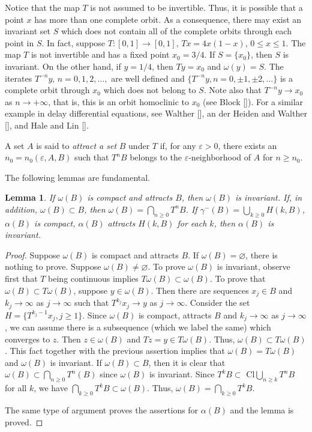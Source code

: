 \documentclass{surv-l}
\theoremstyle{plain}
\newtheorem{lemma}[theorem]{Lemma}
\theoremstyle{definition}
\numberwithin{equation}{section}
\numberwithin{figure}{chapter}
\begin{document}
Notice that the map $T$ is not assumed to be invertible. Thus, it is possible that a point $x$ has more than one complete orbit. As a consequence, there may exist an invariant set $S$ which does not contain all of the complete orbits through each point in $S$. In fact, suppose
$T\!:[0,1]\rightarrow[0,1],\,Tx=4x(1-x)$, $0\leq x\leq 1$. The map $T$ is not invertible and has a fixed point $x_{0}=3/4$. If $S=\{x_{0}\}$, then $S$ is invariant. On the other hand, if $y=1/4$, then $Ty=x_{0}$ and $\omega(y)=S$. The iterates $T^{-n}y,\,n=0,1,2,\ldots,$ are well defined and $\{T^{-n}y, n=0, \pm 1, \pm 2,\ldots\}$ is a complete orbit through $x_{0}$ which does not belong to $S$. Note also that $T^{-n}y\rightarrow x_{0}$ as $ n\rightarrow+\infty$, that is, this is an orbit homoclinic to $x_{0}$ (see Block [\citeyear{1978b}]). For a similar example in delay differential equations, see Walther [\citeyear{1981w}], an der Heiden and Walther [\citeyear{1983dw}], and Hale and Lin [\citeyear{1986hl}].

A set $A$ is said to \emph{attract a set} $B$ under $T$ if, for any $\varepsilon>0$, there exists an $n_{0}=n_{0}(\varepsilon, A, B)$ such that $T^{n}B$ belongs to the $\varepsilon$-neighborhood of $A$ for $n\geq n_{0}$.

The following lemmas are fundamental.

\begin{lemma}\label{lem2.1.1}
If $\omega(B)$ is compact and attracts $B$, then $\omega(B)$ is invariant.
If, in addition, $\omega(B)\subset B$, then $\omega(B)=\bigcap_{n\geq 0}T^{n} B$. If $\gamma^{-}(B)=\bigcup_{k\geq 0}H(k, B)$, $\alpha(B)$ is compact, $\alpha(B)$ attracts $H(k, B)$ for each $k$, then $\alpha(B)$ is invariant.
\end{lemma}

\begin{proof}
Suppose $\omega(B)$ is compact and attracts $B$. If $\omega(B)=\varnothing$, there is nothing to prove. Suppose $\omega(B)\neq\varnothing$. To prove $\omega(B)$ is invariant, observe first that $T$ being continuous implies $T\omega(B)\subset\omega(B)$. To prove that $\omega(B)\subset T\omega(B)$, suppose $y\in\omega(B)$. Then there are sequences $x_{j}\in B$ and $ k_{j}\rightarrow\infty$ as $ j\rightarrow\infty$ such that $T^{k_{j}}x_{j}\rightarrow y$ as $ j\rightarrow\infty$. Consider the set $H=\{T^{k_{j}-1}x_{j},j\geq 1\}$. Since $\omega(B)$ is compact, attracts $B$ and $ k_{j}\rightarrow\infty$ as $ j\rightarrow\infty$, we can assume there is a subsequence (which we label the same) which converges to $z$. Then $z\in\omega(B)$ and $Tz=y\in T\omega(B)$. Thus, $\omega(B)\subset T\omega(B)$. This fact together with the previous assertion implies that $\omega(B)=T\omega(B)$ and $\omega(B)$ is invariant. If $\omega(B)\subset B$, then it is clear that $\omega(B)\subset\bigcap_{n\geq 0}T^{n}(B)$ since $\omega(B)$ is invariant. Since $ T^{k}B\subset$ Cl$\bigcup_{n\geq k}T^{n}B$ for all $k$, we have $\bigcap_{k\geq 0}T^{k}B\subset\omega(B)$. Thus, $\omega(B)=\bigcap_{k\geq 0}T^{k}B$.

The same type of argument proves the assertions for $\alpha(B)$ and the lemma is proved.
\end{proof}
\end{document}

